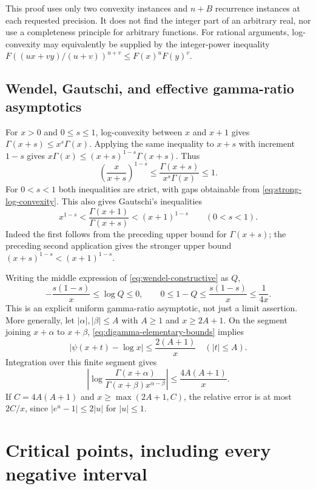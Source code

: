 This proof uses only two convexity instances and $n+B$ recurrence instances
at each requested precision.  It does not find the integer part of an
arbitrary real, nor use a completeness principle for arbitrary functions.
For rational arguments, log-convexity may equivalently be supplied by the
integer-power inequality
$F((u x+v y)/(u+v))^{u+v}\le F(x)^uF(y)^v$.

\subsection{Wendel, Gautschi, and effective gamma-ratio asymptotics}

For $x>0$ and $0\le s\le1$, log-convexity between $x$ and $x+1$ gives
$\Gamma(x+s)\le x^s\Gamma(x)$.  Applying the same inequality to $x+s$
with increment $1-s$ gives
$x\Gamma(x)\le(x+s)^{1-s}\Gamma(x+s)$.  Thus
\begin{equation}\label{eq:wendel-constructive}
 \left(\frac{x}{x+s}\right)^{1-s}
 \le\frac{\Gamma(x+s)}{x^s\Gamma(x)}\le1.
\end{equation}
For $0<s<1$ both inequalities are strict, with gaps obtainable from
\eqref{eq:strong-log-convexity}.  This also gives Gautschi's inequalities
\begin{equation}\label{eq:gautschi-constructive}
 x^{1-s}<\frac{\Gamma(x+1)}{\Gamma(x+s)}<(x+1)^{1-s}
 \qquad(0<s<1).
\end{equation}
Indeed the first follows from the preceding upper bound for
$\Gamma(x+s)$; the preceding second application gives the stronger upper
bound $(x+s)^{1-s}<(x+1)^{1-s}$.

Writing the middle expression of \eqref{eq:wendel-constructive} as $Q$,
\[
 -\frac{s(1-s)}x\le\log Q\le0,
 \qquad 0\le1-Q\le\frac{s(1-s)}x\le\frac1{4x}.
\]
This is an explicit uniform gamma-ratio asymptotic, not just a limit
assertion.  More generally, let $|\alpha|,|\beta|\le A$ with $A\ge1$ and
$x\ge2A+1$.  On the segment joining $x+\alpha$ to $x+\beta$,
\eqref{eq:digamma-elementary-bounds} implies
\[
 |\psi(x+t)-\log x|
 \le\frac{2(A+1)}x\quad(|t|\le A).
\]
Integration over this finite segment gives
\begin{equation}\label{eq:general-gamma-ratio}
 \left|\log\frac{\Gamma(x+\alpha)}{\Gamma(x+\beta)x^{\alpha-\beta}}\right|
 \le\frac{4A(A+1)}x.
\end{equation}
If $C=4A(A+1)$ and $x\ge\max(2A+1,C)$, the relative error is at most
$2C/x$, since $|e^u-1|\le2|u|$ for $|u|\le1$.

\section{Critical points, including every negative interval}
\label{sec:gamma-critical-points}

